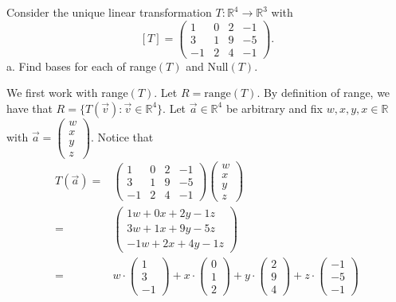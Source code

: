 \documentclass[12pt]{article}
\newenvironment{problem}[2][Problem]
{
	\begin{trivlist} 
		\item[\hskip \labelsep {\bfseries #1 #2:}]
	}
{
	\end{trivlist}
	}
\newenvironment{solution}[1][Solution]
{
	\begin{trivlist} 
		\item[\hskip \labelsep {\itshape #1:}]
	}
	{
	\end{trivlist}
}
\begin{document}
\newpage
\begin{problem}{4}
Consider the unique linear transformation $T:\mathbb{R}^4 \to \mathbb{R}^3$ with
\[
[T]=\begin{pmatrix} 1&0&2&-1\\3&1&9&-5\\-1&2&4&-1 \end{pmatrix} \text{.}
\]
\noindent
\newline
\newline
a. Find bases for each of range$(T)$ and Null$(T)$.
\begin{solution}
We first work with range$(T)$. Let $R=\text{range}(T)$. By definition of range, we have that $R=\{T(\vec{v}):\vec{v} \in \mathbb{R}^4 \}$. Let $\vec{a} \in \mathbb{R}^4$ be arbitrary and fix $w,x,y,x \in \mathbb{R}$ with $\vec{a} = \begin{pmatrix} w\\x\\y\\z \end{pmatrix}$. Notice that \begin{align*}
T(\vec{a}) =& \begin{pmatrix} 1&0&2&-1\\3&1&9&-5\\-1&2&4&-1 \end{pmatrix} \begin{pmatrix} w\\x\\y\\z \end{pmatrix}\\
=& \begin{pmatrix} 1w+0x+2y-1z\\3w+1x+9y-5z\\-1w+2x+4y-1z \end{pmatrix} \\
=& w\cdot \begin{pmatrix} 1\\3\\-1 \end{pmatrix} + x\cdot \begin{pmatrix} 0\\1\\2 \end{pmatrix} + y\cdot \begin{pmatrix} 2\\9\\4 \end{pmatrix} +z\cdot \begin{pmatrix} -1\\-5\\-1 \end{pmatrix}

\end{align*}
\end{solution}
\end{problem}
\end{document}
